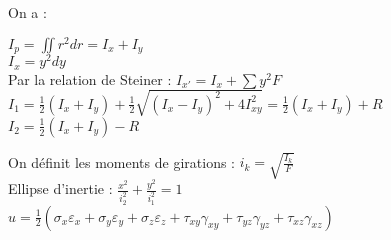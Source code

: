 \documentclass[../main.tex]{subfiles}
\begin{document}
On a :\\
\begin{minipage}{.5\textwidth}
$I_p = \iint r^2dr = I_x + I_y$\\
$I_x = y^2dy$\\
Par la relation de Steiner : $I_{x'} = I_x + \sum y^2 F$\\
$I_1 = \frac{1}{2}(I_x+I_y) + \frac{1}{2}\sqrt{(I_x-I_y)^2+4I_{xy}^2} = \frac{1}{2}(I_x+I_y) + R$\\
$I_2 = \frac{1}{2}(I_x+I_y) - R$\\
\end{minipage}
\vline
\begin{minipage}{.5\textwidth}
On définit les moments de girations : $i_k = \sqrt{\frac{I_k}{F}}$\\
Ellipse d'inertie : $\frac{x^2}{i_2^2} + \frac{y^2}{i_1^2} = 1$\\
$u = \frac{1}{2}(\sigma_x \varepsilon_x + \sigma_y \varepsilon_y + \sigma_z \varepsilon_z + \tau_{xy}\gamma_{xy} + \tau_{yz}\gamma_{yz} + \tau_{xz}\gamma_{xz})$\\
\end{minipage}
\end{document}
